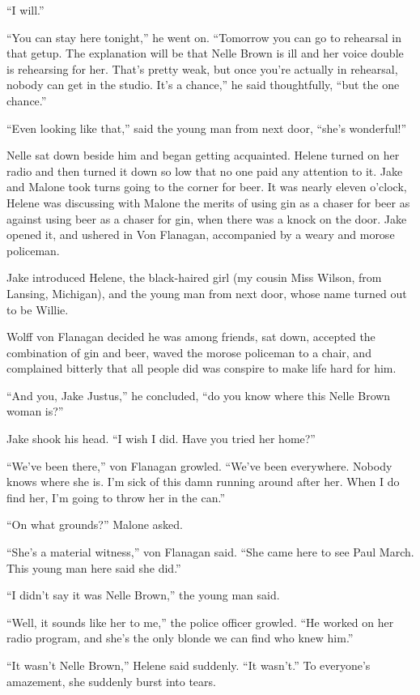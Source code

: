 \documentclass{novel}
\begin{document}
“I will.”

“You can stay here tonight,” he went on. “Tomorrow you can go to rehearsal in that getup. The explanation will be that Nelle Brown is ill and her voice double is rehearsing for her. That’s pretty weak, but once you’re actually in rehearsal, nobody can get in the studio. It’s a chance,” he said thoughtfully, “but the one chance.”

“Even looking like that,” said the young man from next door, “she’s wonderful!”

Nelle sat down beside him and began getting acquainted. Helene turned on her radio and then turned it down so low that no one paid any attention to it. Jake and Malone took turns going to the corner for beer. It was nearly eleven o’clock, Helene was discussing with Malone the merits of using gin as a chaser for beer as against using beer as a chaser for gin, when there was a knock on the door. Jake opened it, and ushered in Von Flanagan, accompanied by a weary and morose policeman.

Jake introduced Helene, the black-haired girl (my cousin Miss Wilson, from Lansing, Michigan), and the young man from next door, whose name turned out to be Willie.

Wolff von Flanagan decided he was among friends, sat down, accepted the combination of gin and beer, waved the morose policeman to a chair, and complained bitterly that all people did was conspire to make life hard for him.

“And you, Jake Justus,” he concluded, “do you know where this Nelle Brown woman is?”

Jake shook his head. “I wish I did. Have you tried her home?”

“We’ve been there,” von Flanagan growled. “We’ve been everywhere. Nobody knows where she is. I’m sick of this damn running around after her. When I do find her, I’m going to throw her in the can.”

“On what grounds?” Malone asked.

“She’s a material witness,” von Flanagan said. “She came here to see Paul March. This young man here said she did.”

“I didn’t say it was Nelle Brown,” the young man said.

“Well, it sounds like her to me,” the police officer growled. “He worked on her radio program, and she’s the only blonde we can find who knew him.”

“It wasn’t Nelle Brown,” Helene said suddenly. “It wasn’t.” To everyone’s amazement, she suddenly burst into tears.
\end{document}

